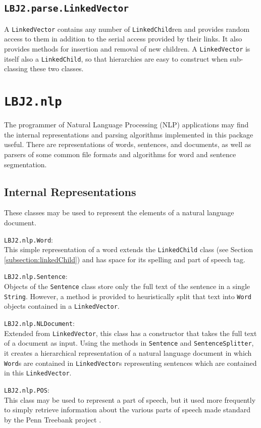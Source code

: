 \subsection{{\tt LBJ2.parse.LinkedVector}} \label{subsection:linkedVector}
A {\tt LinkedVector} contains any number of {\tt LinkedChild}ren and provides
random access to them in addition to the serial access provided by their
links.  It also provides methods for insertion and removal of new children.  A
{\tt LinkedVector} is itself also a {\tt LinkedChild}, so that hierarchies are
easy to construct when sub-classing these two classes.

\section{{\tt LBJ2.nlp}}

The programmer of Natural Language Processing (NLP) applications may find the
internal representations and parsing algorithms implemented in this package
useful.  There are representations of words, sentences, and documents, as well
as parsers of some common file formats and algorithms for word and sentence
segmentation.

\subsection{Internal Representations} \label{subsection:IR}

These classes may be used to represent the elements of a natural language
document.

\begin{list}{}{}
\item[{\tt LBJ2.nlp.Word}:] ~\\
This simple representation of a word extends the {\tt LinkedChild} class (see
Section \ref{subsection:linkedChild}) and has space for its spelling and part
of speech tag.

\item[{\tt LBJ2.nlp.Sentence}:] ~\\
Objects of the {\tt Sentence} class store only the full text of the sentence
in a single {\tt String}.  However, a method is provided to heuristically
split that text into {\tt Word} objects contained in a {\tt LinkedVector}.

\item[{\tt LBJ2.nlp.NLDocument}:] ~\\
Extended from {\tt LinkedVector}, this class has a constructor that takes the
full text of a document as input.  Using the methods in {\tt Sentence} and
{\tt SentenceSplitter}, it creates a hierarchical representation of a natural
language document in which {\tt Word}s are contained in {\tt LinkedVector}s
representing sentences which are contained in this {\tt LinkedVector}.

\item[{\tt LBJ2.nlp.POS}:] ~\\
This class may be used to represent a part of speech, but it used more
frequently to simply retrieve information about the various parts of speech
made standard by the Penn Treebank project \cite{marcus94building}.
\end{list}

